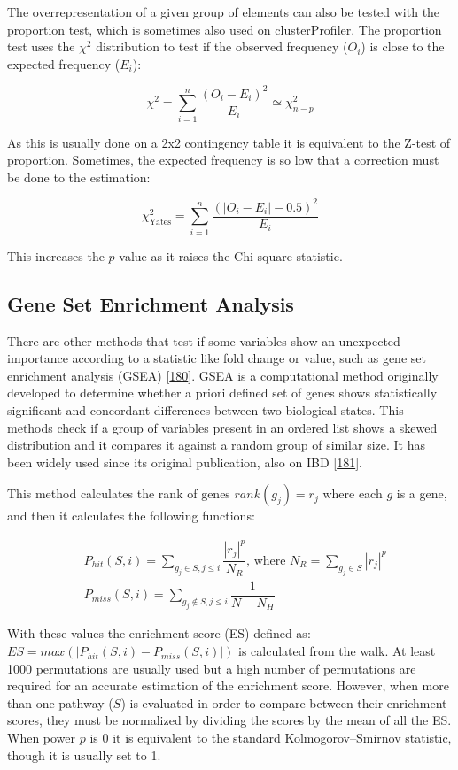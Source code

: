 \documentclass[
  a4paper,
]{book}
\begin{document}
The overrepresentation of a given group of elements can also be tested with the proportion test, which is sometimes also used on clusterProfiler.
The proportion test uses the \(\chi^2\) distribution to test if the observed frequency (\(O_i\)) is close to the expected frequency (\(E_i\)):

\[
\chi^2 = \sum_{i =1}^n \dfrac{(O_i - E_i)^2}{E_i} \simeq \chi_{n-p}^2
\]

As this is usually done on a 2x2 contingency table it is equivalent to the Z-test of proportion.
Sometimes, the expected frequency is so low that a correction must be done to the estimation:

\[
\chi_{\text{Yates}}^2 = \sum_{i =1}^n \dfrac{(|O_i - E_i | - 0.5)^2}{E_i}
\]

This increases the \(p\)-value as it raises the Chi-square statistic.

\hypertarget{gene-set-enrichment-analysis}{%
\subsection{Gene Set Enrichment Analysis}\label{gene-set-enrichment-analysis}}

There are other methods that test if some variables show an unexpected importance according to a statistic like fold change or value, such as gene set enrichment analysis (GSEA) {[}\protect\hyperlink{ref-subramanian2005}{180}{]}.
GSEA is a computational method originally developed to determine whether a priori defined set of genes shows statistically significant and concordant differences between two biological states.
This methods check if a group of variables present in an ordered list shows a skewed distribution and it compares it against a random group of similar size.
It has been widely used since its original publication, also on IBD {[}\protect\hyperlink{ref-protiva2016}{181}{]}.

This method calculates the rank of genes \(rank(g_j)=r_j\) where each \(g\) is a gene, and then it calculates the following functions:

\[
\begin{aligned}
& P_{hit}(S, i) = \sum_{g_j \in S, j \leq i}\dfrac{|r_j|^p}{N_R} \text{, where } N_R = \sum_{g_j \in S}|r_j|^p \\
& P_{miss}(S, i) = \sum_{g_j \not \in S, j \leq i}\dfrac{1}{N - N_H}
\end{aligned}
\]

With these values the enrichment score (ES) defined as: \(ES=max(|P_{hit}(S, i)-P_{miss}(S, i)\vert)\) is calculated from the walk.
At least 1000 permutations are usually used but a high number of permutations are required for an accurate estimation of the enrichment score.
However, when more than one pathway (\(S\)) is evaluated in order to compare between their enrichment scores, they must be normalized by dividing the scores by the mean of all the ES.
When power \(p\) is 0 it is equivalent to the standard Kolmogorov--Smirnov statistic, though it is usually set to 1.
\end{document}
